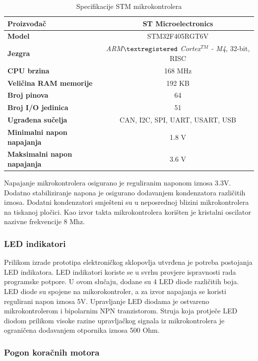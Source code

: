 \documentclass[11pt,a4paper]{article}
\begin{document}
\begin{table}[H]
	\centering
	\caption{Specifikacije STM mikrokontrolera}
	\label{tab:specifikacija_MCU}
	\begin{tabular}{|l|c|}
		\hline
		\textbf{Proizvođač} & ST Microelectronics \\ \hline 
		\textbf{Model} &  STM32F405RGT6V \\ \hline 
		\textbf{Jezgra} & \textit{ ARM$\textregistered$ Cortex$^{TM}$ - M4}, 32-bit, RISC  \\ \hline 
		\textbf{CPU brzina} & 168 MHz \\ \hline 
		\textbf{Veličina RAM memorije} & 192 KB \\ \hline 
		\textbf{Broj pinova} & 64 \\ \hline 
		\textbf{Broj I/O jedinica} & 51 \\ \hline 
		\textbf{Ugrađena sučelja} & CAN, I2C, SPI, UART, USART, USB\\ \hline 
		\textbf{Minimalni napon napajanja} & 1.8 V\\ \hline 
		\textbf{Maksimalni napon napajanja} & 3.6 V\\ \hline 
	\end{tabular}
\end{table}

Napajanje mikrokontrolera osigurano je reguliranim naponom iznosa 3.3V. Dodatno stabiliziranje napona je osigurano dodavanjem kondenzatora različitih iznosa. Dodatni kondenzatori smješteni su u neposrednoj blizini mikrokontrolera na tiskanoj pločici. Kao izvor takta mikrokontrolera korišten je kristalni oscilator nazivne frekvencije 8 Mhz.

\subsubsection{LED indikatori}
Prilikom izrade prototipa elektroničkog sklopovlja utvrđena je potreba postojanja LED indikatora. LED indikatori koriste se u svrhu provjere ispravnosti rada programske potpore. U ovom slučaju, dodane su 4 LED diode različitih boja. LED diode su spojene na mikorokontroler, a za izvor napajanja se koristi regulirani napon iznosa 5V. Upravljanje LED diodama je ostvareno mikrokontrolerom i bipolarnim NPN tranzistorom. Struja koja protječe LED diodom prilikom visoke razine upravljačkog signala iz mikrokontrolera je ograničena dodavanjem otpornika iznosa 500 Ohm. 


\subsubsection{Pogon koračnih motora}
\end{document}
